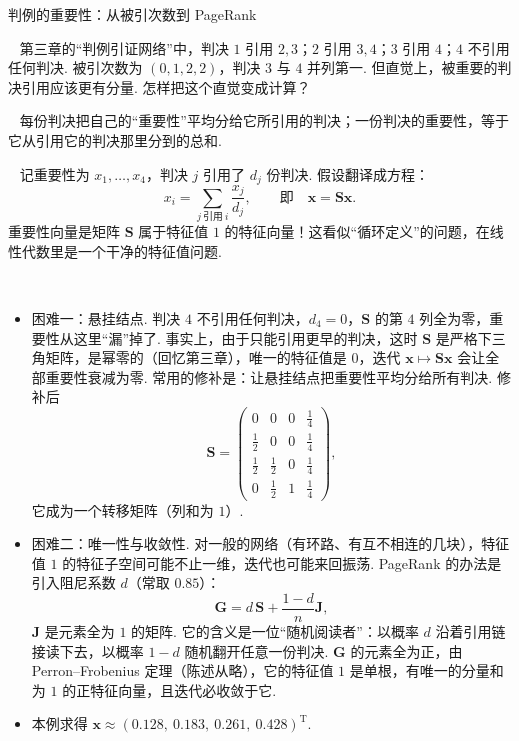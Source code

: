 \documentclass[lang=cn,10.5pt,scheme=chinese,toc=twocol,section,chinesefont=nofont,
twoside,citestyle=gb7714-2015,bibstyle=gb7714-2015]{elegantbook}
\DeclareRobustCommand{\textbf}[1]{{\lnsemiboldlatin\lnsemiboldcjk #1}}
\newcommand{\vv}[1]{\boldsymbol{#1}}
\newcommand{\trans}{\mathrm{T}}             %
\numberwithin{equation}{section}   %
\newcommand{\mstep}[1]{\par\smallskip\noindent\textbf{【#1】}\ }
\begin{document}
\begin{modelbox}{判例的重要性：从被引次数到 PageRank}
  \mstep{问题} 第三章的“判例引证网络”中，判决 $1$ 引用 $2,3$；$2$ 引用 $3,4$；$3$ 引用 $4$；$4$ 不引用任何判决. 被引次数为 $(0,1,2,2)$，判决 $3$ 与 $4$ 并列第一. 但直觉上，被\textbf{重要的}判决引用应该更有分量. 怎样把这个直觉变成计算？

  \mstep{假设} 每份判决把自己的“重要性”平均分给它所引用的判决；一份判决的重要性，等于它从引用它的判决那里分到的总和.

  \mstep{模型} 记重要性为 $x_1,\ldots,x_4$，判决 $j$ 引用了 $d_j$ 份判决. 假设翻译成方程：
  \[x_i=\sum_{j\ \text{引用}\ i}\frac{x_j}{d_j},\qquad\text{即}\quad \vv x=\vv S\vv x.\]
  重要性向量是矩阵 $\vv S$ 属于特征值 $1$ 的特征向量！这看似“循环定义”的问题，在线性代数里是一个干净的特征值问题.

  \mstep{求解}
  \begin{itemize}
    \item \textbf{困难一：悬挂结点.} 判决 $4$ 不引用任何判决，$d_4=0$，$\vv S$ 的第 $4$ 列全为零，重要性从这里“漏”掉了. 事实上，由于只能引用更早的判决，这时 $\vv S$ 是严格下三角矩阵，是\textbf{幂零}的（回忆第三章），唯一的特征值是 $0$，迭代 $\vv x\mapsto\vv{Sx}$ 会让全部重要性衰减为零. 常用的修补是：让悬挂结点把重要性平均分给所有判决. 修补后
          \[\vv S=
            \begin{pmatrix}
              0 & 0 & 0 & \frac14 \\ \frac12&0&0&\frac14\\ \frac12&\frac12&0&\frac14\\ 0&\frac12&1&\frac14
            \end{pmatrix}
            ,\]
          它成为一个转移矩阵（列和为 $1$）.
    \item \textbf{困难二：唯一性与收敛性.} 对一般的网络（有环路、有互不相连的几块），特征值 $1$ 的特征子空间可能不止一维，迭代也可能来回振荡. PageRank 的办法是引入\textbf{阻尼系数} $d$（常取 $0.85$）：
          \[\vv G=d\,\vv S+\frac{1-d}{n}\vv J,\]
          $\vv J$ 是元素全为 $1$ 的矩阵. 它的含义是一位“随机阅读者”：以概率 $d$ 沿着引用链接读下去，以概率 $1-d$ 随机翻开任意一份判决. $\vv G$ 的元素全为正，由 Perron–Frobenius 定理（陈述从略），它的特征值 $1$ 是单根，有唯一的分量和为 $1$ 的正特征向量，且迭代必收敛于它.
    \item 本例求得 $\vv x\approx(0.128,\ 0.183,\ 0.261,\ 0.428)^\trans$.
  \end{itemize}
  \begin{center}
    \begin{tikzpicture}

\end{tikzpicture}
\end{center}
\end{modelbox}
\end{document}
